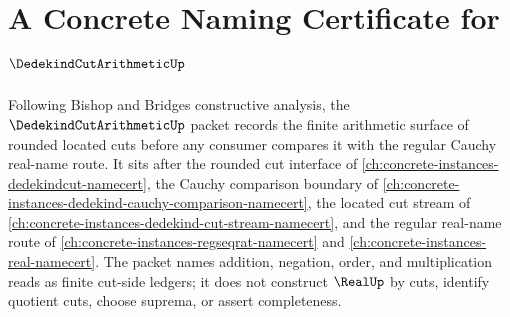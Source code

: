 \chapter{A Concrete Naming Certificate for $\DedekindCutArithmeticUp$}
\label{ch:concrete-instances-dedekind-cut-arithmetic-namecert}

Following Bishop and Bridges constructive analysis, the $\DedekindCutArithmeticUp$ packet records the finite arithmetic surface of rounded located cuts before any consumer compares it with the regular Cauchy real-name route. It sits after the rounded cut interface of \autoref{ch:concrete-instances-dedekindcut-namecert}, the Cauchy comparison boundary of \autoref{ch:concrete-instances-dedekind-cauchy-comparison-namecert}, the located cut stream of \autoref{ch:concrete-instances-dedekind-cut-stream-namecert}, and the regular real-name route of \autoref{ch:concrete-instances-regseqrat-namecert} and \autoref{ch:concrete-instances-real-namecert}. The packet names addition, negation, order, and multiplication reads as finite cut-side ledgers; it does not construct $\RealUp$ by cuts, identify quotient cuts, choose suprema, or assert completeness.

